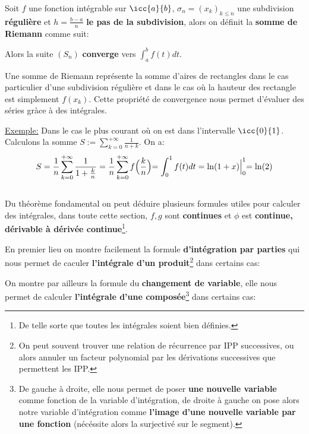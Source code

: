 Soit \(f\) une fonction intégrable sur \(\icc{a}{b}\), \(\sigma_n = (x_k)_{k \leq n}\) une subdivision \textbf{régulière} et \(h = \frac{b - a}{n}\) \textbf{le pas de la subdivision}, alors on définit la \textbf{somme de Riemann} comme suit:

Alors la suite \((S_n)\) \textbf{converge} vers \(\int_{a}^{b} f(t) d t\).\<

Une somme de Riemann représente la somme d'aires de rectangles dans le cas particulier d'une subdivision régulière et dans le cas où la hauteur des rectangle est simplement \(f(x_k)\). Cette propriété de convergence nous permet d'évaluer des séries gràce à des intégrales.\<

\underline{Exemple:} Dans le cas le plus courant où on est dans l'intervalle \(\icc{0}{1}\). Calculons la somme \(S := \sum_{k=0}^{+\infty} \frac{1}{n + k}\). On a:
\[
   S =  \frac{1}{n}\sum_{k=0}^{+\infty} \frac{1}{1 + \frac{k}{n}} = \frac{1}{n}\sum_{k=0}^{+\infty} f\Bigl(\frac{k}{n}\Bigl) = \int_{0}^{1} f(t) d t = \ln(1 + x) \Bigl|_{0}^{1} = \ln(2)
\]

\subsection*{}

Du théorème fondamental on peut déduire plusieurs formules utiles pour calculer des intégrales, dans toute cette section, \(f, g\) sont \textbf{continues} et \(\phi\) est \textbf{continue, dérivable à dérivée continue}\footnote[3]{De telle sorte que toutes les intégrales soient bien définies.}.\< 

En premier lieu on montre facilement la formule \textbf{d'intégration par parties} qui nous permet de caculer \textbf{l'intégrale d'un produit}\footnote[4]{On peut souvent trouver une relation de récurrence par IPP successives, ou alors annuler un facteur polynomial par les dérivations successives que permettent les IPP.} dans certains cas:

On montre par ailleurs la formule du \textbf{changement de variable}, elle nous permet de calculer \textbf{l'intégrale d'une composée}\footnote[5]{De gauche à droite, elle nous permet de poser \textbf{une nouvelle variable} comme fonction de la variable d'intégration, de droite à gauche on pose alors notre variable d'intégration comme \textbf{l'image d'une nouvelle variable par une fonction} (nécéssite alors la surjectivé sur le segment).} dans certains cas:


